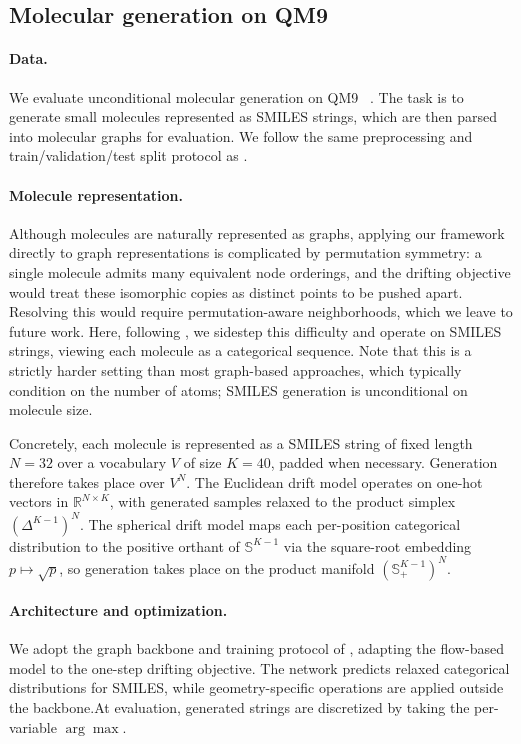 \documentclass{article}
\theoremstyle{plain}
\begin{document}
\subsection{Molecular generation on QM9}

\paragraph{Data.}
We evaluate unconditional molecular generation on QM9 ~\citep{Wu_2018_MoleculeNet}. The task is to generate small molecules represented as SMILES strings, which are then parsed into molecular graphs for evaluation. We follow the same preprocessing and train/validation/test split protocol as \citet{park2026pairflow}.


\paragraph{Molecule representation.}
Although molecules are naturally represented as graphs, applying our framework directly to graph representations is complicated by permutation symmetry: a single molecule admits many equivalent node orderings, and the drifting objective would treat these isomorphic copies as distinct points to be pushed apart. Resolving this would require permutation-aware neighborhoods, which we leave to future work. Here, following \citet{park2026pairflow}, we sidestep this difficulty and operate on SMILES strings, viewing each molecule as a categorical sequence. Note that this is a strictly harder setting than most graph-based approaches, which typically condition on the number of atoms; SMILES generation is unconditional on molecule size.

Concretely, each molecule is represented as a SMILES string of fixed length \(N=32\) over a vocabulary \({V}\) of size \(K=40\), padded when necessary. Generation therefore takes place over \({V}^N\). The Euclidean drift model operates on one-hot vectors in \(\mathbb{R}^{N \times K}\), with generated samples relaxed to the product simplex \((\Delta^{K-1})^N\). The spherical drift model maps each per-position categorical distribution to the positive orthant of \(\mathbb{S}^{K-1}\) via the square-root embedding \(p \mapsto \sqrt{p}\), so generation takes place on the product manifold \((\mathbb{S}^{K-1}_{+})^N\).

\paragraph{Architecture and optimization.}
We adopt the graph backbone and training protocol of \citet{park2026pairflow}, adapting the flow-based model to the one-step drifting objective. The network predicts relaxed categorical distributions for SMILES, while geometry-specific operations are applied outside the backbone.At evaluation, generated strings are discretized by taking the per-variable \(\arg\max\).
\end{document}
